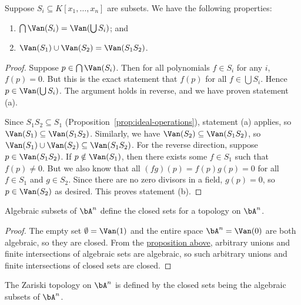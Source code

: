 \begin{proposition}\label{prop:vanishing-locus-properties}
    Suppose \(S_i \subseteq K[x_1,\hdots,x_n]\) are subsets.
    We have the following properties:
    \begin{enumerate}[label={(\alph*)}, itemsep=0mm]
        \item \(\bigcap \Van(S_i) = \Van(\bigcup S_i)\); and
        \item \(\Van(S_1) \cup \Van(S_2) = \Van(S_1 S_2)\).
    \end{enumerate}
\end{proposition}
\begin{proof}
    Suppose \(p \in \bigcap \Van(S_i)\).
    Then for all polynomials \(f \in S_i\) for any \(i\), \(f(p) = 0\).
    But this is the exact statement that \(f(p)\) for all \(f \in \bigcup S_i\).
    Hence \(p \in \Van(\bigcup S_i)\).
    The argument holds in reverse,
    and we have proven statement (a).

    Since \(S_1 S_2 \subseteq S_1\) (Proposition~\ref{prop:ideal-operations}),
    statement (a) applies, so \(\Van(S_1) \subseteq \Van(S_1 S_2)\).
    Similarly, we have \(\Van(S_2) \subseteq \Van(S_1 S_2)\),
    so \(\Van(S_1) \cup \Van(S_2) \subseteq \Van(S_1 S_2)\).
    For the reverse direction, suppose \(p \in \Van(S_1 S_2)\).
    If \(p \notin \Van(S_1)\), then there exists some \(f \in S_1\) such that \(f(p) \neq 0\).
    But we also know that all \((fg)(p) = f(p)g(p) = 0\) for all \(f \in S_1\) and \(g \in S_2\).
    Since there are no zero divisors in a field, \(g(p) = 0\),
    so \(p \in \Van(S_2)\) as desired.
    This proves statement (b).
\end{proof}
\begin{corollary}
    Algebraic subsets of \(\bA^n\) define the closed sets for a topology on \(\bA^n\).
\end{corollary}
\begin{proof}
    The empty set \(\emptyset = \Van(1)\) and the entire space \(\bA^n = \Van(0)\)
    are both algebraic, so they are closed.
    From the \hyperref[prop:vanishing-locus-properties]{proposition above},
    arbitrary unions and finite intersections of algebraic sets are algebraic,
    so such arbitrary unions and finite intersections of closed sets are closed.
\end{proof}
\begin{definition}
    The Zariski topology on \(\bA^n\) is defined by
    the closed sets being the algebraic subsets of \(\bA^n\).
\end{definition}
